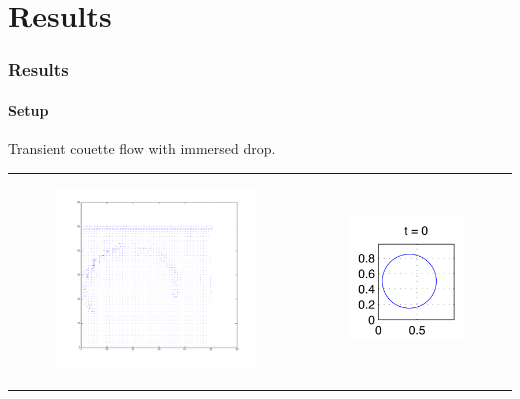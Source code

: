 \documentclass[ucs]{beamer}
\begin{document}
\section{Results}
\begin{frame}
\frametitle{Results}
\framesubtitle{Setup}
Transient couette flow with immersed drop.
\begin{tabular}{l l}
\begin{minipage}{0.5\textwidth}

\begin{figure}[h!]
\includegraphics[width=7cm]{plots/vel0.png}
\end{figure}
\end{minipage}
&
\begin{minipage}{0.5\textwidth}
\begin{figure}[h!]
  \includegraphics[width=4cm]{plots/interface_t0.png}
\end{figure}
\end{minipage}
\end{tabular}
\end{frame}
\end{document}
